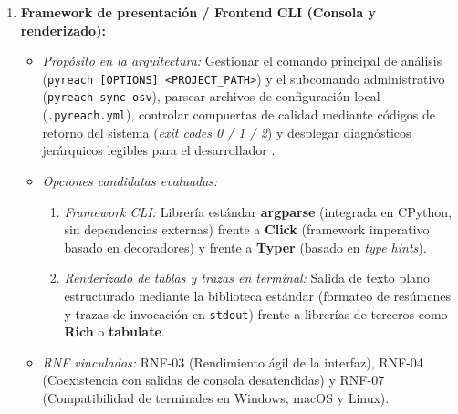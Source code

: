 \begin{enumerate}
    \item \textbf{Framework de presentación / Frontend CLI (Consola y renderizado):}
    \begin{itemize}
        \item \textit{Propósito en la arquitectura:} Gestionar el comando principal de análisis (\texttt{pyreach [OPTIONS] <PROJECT\_\allowbreak PATH>}) y el subcomando administrativo (\texttt{pyreach sync-\allowbreak osv}), parsear archivos de configuración local (\texttt{.\allowbreak pyreach.\allowbreak yml}), controlar compuertas de calidad mediante códigos de retorno del sistema (\textit{exit codes 0 / 1 / 2}) y desplegar diagnósticos jerárquicos legibles para el desarrollador \cite{humble2010continuous, wiegers2013software}.
        \item \textit{Opciones candidatas evaluadas:}
        \begin{enumerate}[label=\alph*)]
            \item \textit{Framework CLI:} Librería estándar \textbf{argparse} (integrada en CPython, sin dependencias externas) frente a \textbf{Click} (framework imperativo basado en decoradores) y frente a \textbf{Typer} (basado en \textit{type hints}).
            \item \textit{Renderizado de tablas y trazas en terminal:} Salida de texto plano estructurado mediante la biblioteca estándar (formateo de resúmenes y trazas de invocación en \texttt{stdout}) frente a librerías de terceros como \textbf{Rich} o \textbf{tabulate}.
        \end{enumerate}
        \item \textit{RNF vinculados:} RNF-03 (Rendimiento ágil de la interfaz), RNF-04 (Coexistencia con salidas de consola desatendidas) y RNF-07 (Compatibilidad de terminales en Windows, macOS y Linux).
    \end{itemize}


\end{enumerate}
